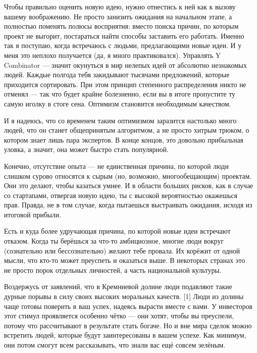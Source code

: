 \documentclass[ebook,12pt,oneside,openany]{memoir}
\begin{document}
Чтобы правильно оценить новую идею, нужно отнестись к ней как к вызову
вашему воображению. Не просто занизить ожидания на начальном этапе, а
полностью поменять полюсы восприятия: вместо поиска причин, по которым
проект не выгорит, постараться найти способы заставить его работать.
Именно так я поступаю, когда встречаюсь с людьми, предлагающими новые
идеи. И у меня это неплохо получается (да, я много практиковался).
Управлять Y Combinator — значит окунуться в мир нелепых идей от
абсолютно незнакомых людей. Каждые полгода тебя закидывают тысячами
предложений, которые приходится сортировать. При этом принцип
степенного распределения никто не отменял — так что будет крайне
болезненно, если вы в итоге пропустите ту самую иголку в стоге сена.
Оптимизм становится необходимым качеством. \newline

И я надеюсь, что со временем таким оптимизмом заразится настолько
много людей, что он станет общепринятым алгоритмом, а не просто хитрым
трюком, о котором знает лишь пара экспертов. В конце концов, это
довольно прибыльная уловка, а значит, она может быстро стать
популярной. \newline

Конечно, отсутствие опыта — не единственная причина, по которой люди
слишком сурово относятся к сырым (но, возможно, многообещающим)
проектам. Они это делают, чтобы казаться умнее. И в области больших
рисков, как в случае со стартапами, отвергая новую идею, ты с высокой
вероятностью окажешься прав. Правда, не в том случае, когда пытаешься
выстраивать ожидания, исходя из итоговой прибыли. \newline

Есть и куда более удручающая причина, по которой новые идеи встречают
отказом. Когда ты берёшься за что-то амбициозное, многие люди вокруг
(сознательно или бессознательно) желают тебе провала. Их корёжит от
одной мысли, что кто-то может преуспеть и оказаться выше. В некоторых
странах это не просто порок отдельных личностей, а часть национальной
культуры. \newline

Воздержусь от заявлений, что в Кремниевой долине люди подавляют такие
дурные порывы в силу своих высоких моральных качеств. [1] Люди из
долины чаще готовы поверить в ваш успех, надеясь вырасти вместе с
вами. У инвесторов этот стимул проявляется особенно чётко — они хотят,
чтобы вы преуспели, потому что рассчитывают в результате стать богаче.
Но и вне мира сделок можно встретить людей, которые будут
заинтересованы в вашем успехе. Как минимум, они потом смогут всем
рассказывать, что знали вас ещё совсем зелёным. \newline
\end{document}
